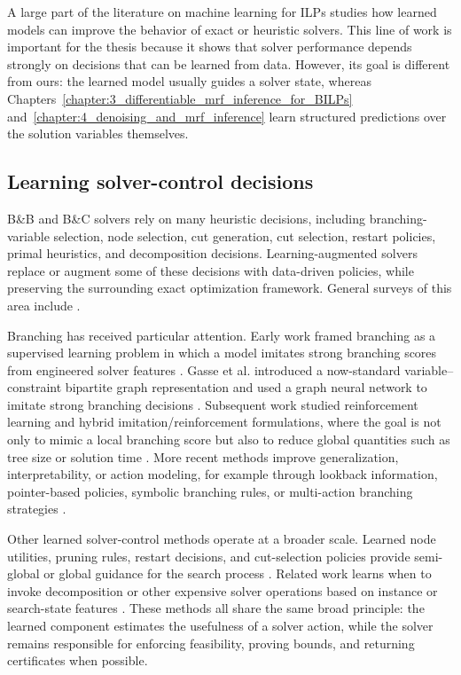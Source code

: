 A large part of the literature on machine learning for ILPs studies how learned models can improve the behavior of exact or heuristic solvers. This line of work is important for the thesis because it shows that solver performance depends strongly on decisions that can be learned from data. However, its goal is different from ours: the learned model usually guides a solver state, whereas Chapters~\ref{chapter:3_differentiable_mrf_inference_for_BILPs} and~\ref{chapter:4_denoising_and_mrf_inference} learn structured predictions over the solution variables themselves.

\subsection{Learning solver-control decisions}
\label{subsec:rw_solver_control}

B\&B and B\&C solvers rely on many heuristic decisions, including branching-variable selection, node selection, cut generation, cut selection, restart policies, primal heuristics, and decomposition decisions. Learning-augmented solvers replace or augment some of these decisions with data-driven policies, while preserving the surrounding exact optimization framework. General surveys of this area include \cite{bengio_machine_2018,cappart_combinatorial_2023,scavuzzo_machine_2024}.

Branching has received particular attention. Early work framed branching as a supervised learning problem in which a model imitates strong branching scores from engineered solver features \cite{khalil_learning_2016}. Gasse et al. introduced a now-standard variable--constraint bipartite graph representation and used a graph neural network to imitate strong branching decisions \cite{gasse_exact_2019}. Subsequent work studied reinforcement learning and hybrid imitation/reinforcement formulations, where the goal is not only to mimic a local branching score but also to reduce global quantities such as tree size or solution time \cite{he_learning_2014,nair_solving_2020,ding_accelerating_2020}. More recent methods improve generalization, interpretability, or action modeling, for example through lookback information, pointer-based policies, symbolic branching rules, or multi-action branching strategies \cite{gupta_lookback_2022,wang_learning_2024,kuang_towards_2024,luttmann_multi-action_2025}.

Other learned solver-control methods operate at a broader scale. Learned node utilities, pruning rules, restart decisions, and cut-selection policies provide semi-global or global guidance for the search process \cite{he_learning_2014,lodi_learning_2017,tang_reinforcement_2020,balcan_learning_2024}. Related work learns when to invoke decomposition or other expensive solver operations based on instance or search-state features \cite{salvagnin_learning_2017}. These methods all share the same broad principle: the learned component estimates the usefulness of a solver action, while the solver remains responsible for enforcing feasibility, proving bounds, and returning certificates when possible.

